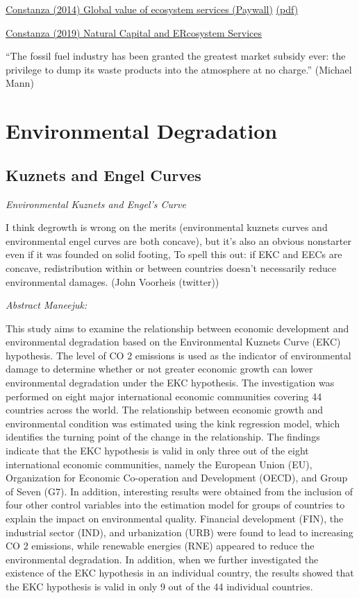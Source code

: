 \documentclass[
]{book}
\begin{document}
\href{https://doi.org/10.1016/j.gloenvcha.2014.04.002}{Constanza (2014) Global value of ecosystem services (Paywall)}
\href{pdf/Costanza_2014_Global_Ecosystem_Services.pdf}{(pdf)}

\href{pdf/Costanza_2019_Natural_Capital_and_Ecosystem_services.pdf}{Constanza (2019) Natural Capital and ERcosystem Services}

``The fossil fuel industry has been granted the greatest market subsidy ever: the privilege to dump its waste products into the atmosphere at no charge.'' (Michael Mann)

\hypertarget{environmental-degradation}{%
\section{Environmental Degradation}\label{environmental-degradation}}

\hypertarget{kuznets-and-engel-curves}{%
\subsection{Kuznets and Engel Curves}\label{kuznets-and-engel-curves}}

\emph{Environmental Kuznets and Engel's Curve}

I think degrowth is wrong on the merits (environmental kuznets curves and environmental engel curves
are both concave),
but it's also an obvious nonstarter even if it was founded on solid footing,
To spell this out: if EKC and EECs are concave,
redistribution within or between countries doesn't necessarily reduce environmental damages.
(John Voorheis (twitter))

\emph{Abstract Maneejuk:}

This study aims to examine the relationship between economic development and
environmental degradation based on the Environmental Kuznets Curve (EKC) hypothesis. The level
of CO 2 emissions is used as the indicator of environmental damage to determine whether or not greater
economic growth can lower environmental degradation under the EKC hypothesis. The investigation
was performed on eight major international economic communities covering 44 countries across
the world. The relationship between economic growth and environmental condition was estimated
using the kink regression model, which identifies the turning point of the change in the relationship.
The findings indicate that the EKC hypothesis is valid in only three out of the eight international
economic communities, namely the European Union (EU), Organization for Economic Co-operation
and Development (OECD), and Group of Seven (G7). In addition, interesting results were obtained
from the inclusion of four other control variables into the estimation model for groups of countries
to explain the impact on environmental quality. Financial development (FIN), the industrial sector
(IND), and urbanization (URB) were found to lead to increasing CO 2 emissions, while renewable
energies (RNE) appeared to reduce the environmental degradation. In addition, when we further
investigated the existence of the EKC hypothesis in an individual country, the results showed that the
EKC hypothesis is valid in only 9 out of the 44 individual countries.
\end{document}
